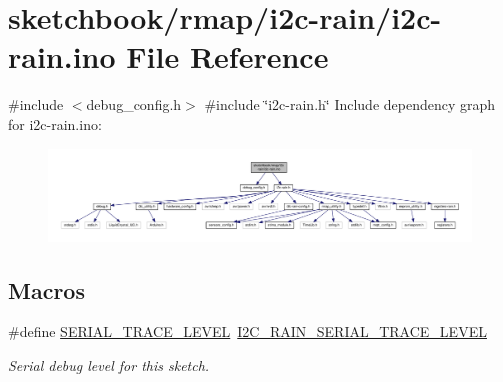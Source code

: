 \hypertarget{i2c-rain_8ino}{}\section{sketchbook/rmap/i2c-\/rain/i2c-\/rain.ino File Reference}
\label{i2c-rain_8ino}
{\ttfamily \#include $<$debug\+\_\+config.\+h$>$}\newline
{\ttfamily \#include \char`\"{}i2c-\/rain.\+h\char`\"{}}\newline
Include dependency graph for i2c-\/rain.ino\+:\nopagebreak
\begin{figure}[H]
\begin{center}
\leavevmode
\includegraphics[width=350pt]{i2c-rain_8ino__incl}
\end{center}
\end{figure}
\subsection*{Macros}
\begin{DoxyCompactItemize}
\item 
\mbox{\label{i2c-rain_8ino_a31fa5c36fa17c66feec7a67b76c3e786}} 
\#define \hyperlink{i2c-rain_8ino_a31fa5c36fa17c66feec7a67b76c3e786}{S\+E\+R\+I\+A\+L\+\_\+\+T\+R\+A\+C\+E\+\_\+\+L\+E\+V\+EL}~\hyperlink{debug__config_8h_ad3ed083a5171e08bb1e3b04391228a4f}{I2\+C\+\_\+\+R\+A\+I\+N\+\_\+\+S\+E\+R\+I\+A\+L\+\_\+\+T\+R\+A\+C\+E\+\_\+\+L\+E\+V\+EL}
\begin{DoxyCompactList}\small\item\em Serial debug level for this sketch. \end{DoxyCompactList}\end{DoxyCompactItemize}
